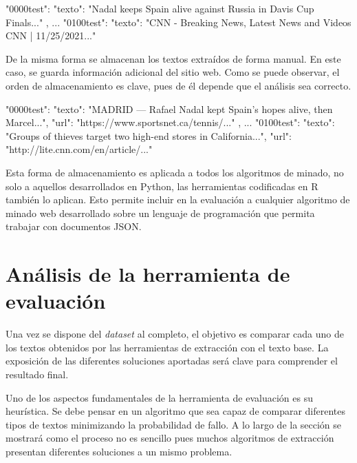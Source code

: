 \begin{Schunk}
  \begin{Soutput}
  {
    "0000test": {
        "texto": "Nadal keeps Spain alive against Russia in Davis Cup Finals..."
    },
    ...
    "0100test": {
        "texto": "CNN - Breaking News, Latest News and Videos CNN | 11/25/2021..."
    }
  }
  \end{Soutput}
\end{Schunk}

De la misma forma se almacenan los textos extraídos de forma manual. En este caso, se guarda información
adicional del sitio web. Como se puede observar, el orden de almacenamiento es clave, pues de él depende
que el análisis sea correcto.

\begin{Schunk}
  \begin{Soutput}
  {
    "0000test": {
        "texto": "MADRID — Rafael Nadal kept Spain’s hopes alive, then Marcel...",
        "url": "https://www.sportsnet.ca/tennis/..."
    },
    ...
    "0100test": {
      "texto": "Groups of thieves target two high-end stores in California...",
      "url": "http://lite.cnn.com/en/article/..."
    }
  }
  \end{Soutput}
\end{Schunk}

Esta forma de almacenamiento es aplicada a todos los algoritmos de minado, no solo a aquellos desarrollados
en Python, las herramientas codificadas en R también lo aplican. Esto permite incluir en la evaluación a
cualquier algoritmo de minado web desarrollado sobre un lenguaje de programación que permita trabajar con
documentos JSON.

\section{Análisis de la herramienta de evaluación}
\label{sec:analisis de la herramienta de evaluacion}

Una vez se dispone del \emph{dataset} al completo, el objetivo es comparar cada uno de los textos obtenidos
por las herramientas de extracción con el texto base. La exposición de las diferentes soluciones aportadas
será clave para comprender el resultado final.

Uno de los aspectos fundamentales de la herramienta de evaluación es su heurística. Se debe pensar en un
algoritmo que sea capaz de comparar diferentes tipos de textos minimizando la probabilidad de fallo. A lo
largo de la sección se mostrará como el proceso no es sencillo pues muchos algoritmos de extracción
presentan diferentes soluciones a un mismo problema.

